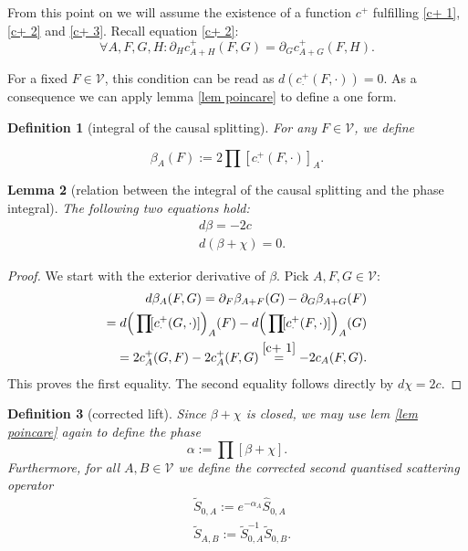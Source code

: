 \documentclass[b5paper,draft,openbib,12pt]{memoir}
\newtheorem{Def}{Definition}
\newtheorem{Lemma}[Def]{Lemma}
\begin{document}
From this point on we will assume the existence of  a function \(c^+\) fulfilling \eqref{c+ 1},\eqref{c+ 2} and \eqref{c+ 3}.
Recall equation \eqref{c+ 2}: 
\begin{equation}
\forall A,F,G,H: \partial_H c_{A+H}^+(F,G)=\partial_G c^+_{A+G}(F,H).
\end{equation}

For a fixed \(F\in\mathcal{V}\), this condition can be read as \(d( c^+_{\cdot} (F,\cdot))=0\). As a consequence we can apply lemma \ref{lem poincare} to define a one form.

\begin{Def}[integral of the causal splitting]
For any \(F\in\mathcal{V}\), we define

\begin{equation}
\beta_A(F):=2 \prod\![c^+_{\cdot}(F,\cdot)]_A.
\end{equation}
\end{Def}

\begin{Lemma}[relation between the integral of the causal splitting and the phase integral]
The following two equations hold:
\begin{align}\label{beta c}
&d \beta=-2 c\\
&d(\beta +\chi)=0.
\end{align}
\end{Lemma}
\begin{proof}
We start with the exterior derivative of \(\beta\). Pick \(A,F,G\in\mathcal{V}\):
\begin{align}
d\beta_A(F,G)=\partial_F \beta_{A+F}(G)-\partial_G \beta_{A+G}(F)\\
=d\Big(\prod\![c^+_\cdot(G,\cdot)]\Big)_A(F)-d\Big(\prod\![c^+_\cdot(F,\cdot)]\Big)_A(G)\\
=2 c^+_A(G,F)-2 c_A^+(F,G)\overset{\eqref{c+ 1}}{=}-2 c_A(F,G).
\end{align}
This proves the first equality. The second equality follows directly by \(d \chi=2 c\).
\end{proof}

\begin{Def}[corrected lift]
Since \(\beta+\chi\) is closed, we may use lem \ref{lem poincare} again to define the phase
\begin{equation}\label{def alpha}
\alpha:=\prod\![\beta+\chi].
\end{equation}
Furthermore, for all \(A,B\in\mathcal{V}\) we define the corrected second quantised scattering operator 
\begin{align}
&\tilde{S}_{0,A}:=e^{-\alpha_A} \hat{S}_{0,A}\\
&\tilde{S}_{A,B}:=\tilde{S}^{-1}_{0,A}\tilde{S}_{0,B}.
\end{align}
\end{Def}
\end{document}
